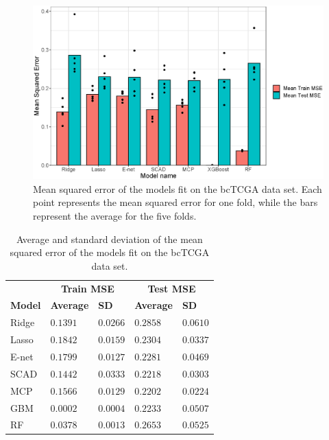 \documentclass{article}
\begin{document}
	\begin{figure}[h!]
		\centering
		\includegraphics[width = 0.8\linewidth]{images/empirical_mse.eps}
		\captionsetup{width = 0.8\textwidth}
		\caption{Mean squared error of the models fit on the bcTCGA data set. Each point represents the mean squared error for one fold, while the bars represent the average for the five folds.}
		\label{fig:empirical_mse}
	\end{figure}
	
	\begin{table}[h!]
		\centering
		\captionsetup{width = 5in}
		\caption{Average and standard deviation of the mean squared error of the models fit on the bcTCGA data set.}
		\label{tab:emp_results}
		\begin{tabular}{l|ll|ll}
			\hline
			& \multicolumn{2}{c|}{\textbf{Train MSE}} & \multicolumn{2}{c}{\textbf{Test MSE}} \\ 
			\textbf{Model } & \textbf{Average} & \textbf{SD} & \textbf{Average} & \textbf{SD} \\ 
			\hline
			Ridge  & $0.1391$ & $0.0266$ & $0.2858$ & $0.0610$ \\
			Lasso  & $0.1842$ & $0.0159$ & $0.2304$ & $0.0337$ \\
			E-net  & $0.1799$ & $0.0127$ & $0.2281$ & $0.0469$ \\
			SCAD  & $0.1442$ & $0.0333$ & $0.2218$ & $0.0303$ \\
			MCP  & $0.1566$ & $0.0129$ & $0.2202$ & $0.0224$ \\
			GBM  & $0.0002$ & $0.0004$ & $0.2233$ & $0.0507$ \\
			RF  & $0.0378$ & $0.0013$ & $0.2653$ & $0.0525$ \\
			\hline 
		\end{tabular}
	\end{table}
	
\end{document}
